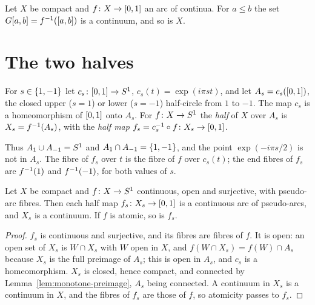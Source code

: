 
\begin{corollary}\label{cor:G-connected}
Let $X$ be compact and $f\colon X\to[0,1]$ an arc of continua. For $a\le b$ the set $G[a,b]=f^{-1}([a,b])$ is a continuum, and so is $X$.
\end{corollary}


\section{The two halves}

\begin{definition}\label{def:halves}
For $s\in\left\{ 1,-1 \right\}$ let $c_s\colon[0,1]\to S^1$, $c_s(t)=\exp(i\pi st)$, and let $A_s=c_s([0,1])$, the closed upper ($s=1$) or lower ($s=-1$) half-circle from $1$
to $-1$. The map $c_s$ is a homeomorphism of $[0,1]$ onto $A_s$. For $f\colon X\to S^1$ the \emph{half} of $X$ over $A_s$ is $X_s=f^{-1}(A_s)$, with the
\emph{half map} $f_s=c_s^{-1}\circ f\colon X_s\to[0,1]$.
\end{definition}


Thus $A_1\cup A_{-1}=S^1$ and $A_1\cap A_{-1}=\left\{ 1,-1 \right\}$, and the point $\exp(-i\pi s/2)$ is not in $A_s$. The fibre of $f_s$ over $t$ is the fibre of $f$
over $c_s(t)$; the end fibres of $f_s$ are $f^{-1}(1)$ and $f^{-1}(-1)$, for both values of $s$.


\begin{proposition}\label{prop:halves}
Let $X$ be compact and $f\colon X\to S^1$ continuous, open and surjective, with pseudo-arc fibres. Then each half map $f_s\colon X_s\to[0,1]$ is a continuous
arc of pseudo-arcs, and $X_s$ is a continuum. If $f$ is atomic, so is $f_s$.
\end{proposition}

\begin{proof}
$f_s$ is continuous and surjective, and its fibres are fibres of $f$. It is open: an open set of $X_s$ is $W\cap X_s$ with $W$ open in $X$, and
$f(W\cap X_s)=f(W)\cap A_s$ because $X_s$ is the full preimage of $A_s$; this is open in $A_s$, and $c_s$ is a homeomorphism. $X_s$ is closed, hence
compact, and connected by Lemma~\ref{lem:monotone-preimage}, $A_s$ being connected. A continuum in $X_s$ is a continuum in $X$, and the fibres of $f_s$ are
those of $f$, so atomicity passes to $f_s$.
\end{proof}

